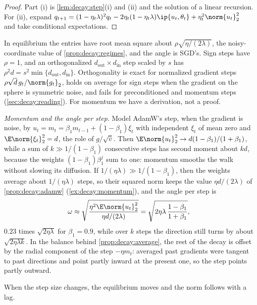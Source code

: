 \begin{refsection}
\begin{proof}
Part (i) is \cref{lem:decay:step}(i) and (ii) and the solution of a linear recursion. For (ii), expand $q_{t+1}=(1-\eta_t\lambda)^2q_t-2\eta_t(1-\eta_t\lambda)\ip{u_t,\theta_t}+\eta_t^2\norm{u_t}_2^2$ and take conditional expectations.
\end{proof}

In equilibrium the entries have root mean square about $\rho\sqrt{\eta/(2\lambda)}$, the noisy-coordinate value of \cref{prop:decay:regimes}, and the angle is SGD's. Sign steps have $\rho=1$, and an orthogonalized $d_{\mathrm{out}}\times d_{\mathrm{in}}$ step scaled by $s$ has $\rho^2d=s^2\min\{d_{\mathrm{out}},d_{\mathrm{in}}\}$. Orthogonality is exact for normalized gradient steps $\rho\sqrt d\,g_t/\norm{g_t}_2$, holds on average for sign steps when the gradient on the sphere is symmetric noise, and fails for preconditioned and momentum steps (\cref{sec:decay:reading}). For momentum we have a derivation, not a proof.

\begin{heuristic}
\emph{Momentum and the angle per step.} Model AdamW's step, when the gradient is noise, by $u_t=m_t=\beta_1m_{t-1}+(1-\beta_1)\xi_t$ with independent $\xi_t$ of mean zero and $\E\norm{\xi_t}_2^2=d$, the role of $g/\sqrt{\hat v}$. Then $\E\norm{u_t}_2^2\to d(1-\beta_1)/(1+\beta_1)$, while a sum of $k\gg1/(1-\beta_1)$ consecutive steps has second moment about $kd$, because the weights $(1-\beta_1)\beta_1^j$ sum to one: momentum smooths the walk without slowing its diffusion. If $1/(\eta\lambda)\gg1/(1-\beta_1)$, then the weights average about $1/(\eta\lambda)$ steps, so their squared norm keeps the value $\eta d/(2\lambda)$ of \cref{prop:decay:adamw} (\cref{ex:decay:momentum}), and the angle per step is
\begin{equation}\label{eq:decay:momentum}
  \omega\approx\sqrt{\frac{\eta^2\E\norm{u_t}_2^2}{\eta d/(2\lambda)}}=\sqrt{2\eta\lambda\,\frac{1-\beta_1}{1+\beta_1}},
\end{equation}
$0.23$ times $\sqrt{2\eta\lambda}$ for $\beta_1=0.9$, while over $k$ steps the direction still turns by about $\sqrt{2\eta\lambda k}$. In the balance behind \cref{prop:decay:average}, the rest of the decay is offset by the radial component of the step $-\eta m_t$: averaged past gradients were tangent to past directions and point partly inward at the present one, so the step points partly outward.
\end{heuristic}

When the step size changes, the equilibrium moves and the norm follows with a lag.


\end{refsection}
